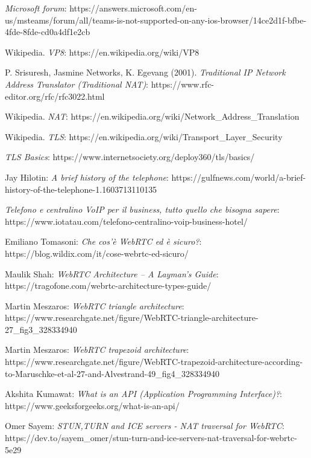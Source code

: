 \documentclass[11pt, a4paper, openany]{book}
\begin{document}
\begin{thebibliography}{9}
 		\emph{Microsoft forum}: https://answers.microsoft.com/en-us/msteams/forum/all/teams-is-not-supported-on-any-ios-browser/14ce2d1f-bfbe-4fde-8fde-cd0a4df1e2cb
 		
 		Wikipedia. \emph{VP8}: https://en.wikipedia.org/wiki/VP8
 		
 		 P. Srisuresh, Jasmine Networks, K. Egevang (2001). \emph{Traditional IP Network Address Translator (Traditional NAT)}: https://www.rfc-editor.org/rfc/rfc3022.html
 		
 		Wikipedia. \emph{NAT}: https://en.wikipedia.org/wiki/Network\_Address\_Translation
 		
 		Wikipedia. \emph{TLS}: https://en.wikipedia.org/wiki/Transport\_Layer\_Security
 		
 		\emph{TLS Basics}: https://www.internetsociety.org/deploy360/tls/basics/	
  		
  		Jay Hilotin: \emph{A brief history of the telephone}: https://gulfnews.com/world/a-brief-history-of-the-telephone-1.1603713110135
  		
  		\emph{Telefono e centralino VoIP per il business, tutto quello che bisogna sapere}: 
  		https://www.iotatau.com/telefono-centralino-voip-business-hotel/
  		
  		Emiliano Tomasoni: \emph{Che cos’è WebRTC ed è sicuro?}: 
  		https://blog.wildix.com/it/cose-webrtc-ed-sicuro/
  		
  		Maulik Shah: \emph{WebRTC Architecture – A Layman’s Guide}: 
  		https://tragofone.com/webrtc-architecture-types-guide/
  		
  		Martin Meszaros: \emph{WebRTC triangle architecture}: 
  		https://www.researchgate.net/figure/WebRTC-triangle-architecture-27\_fig3\_328334940
  		
  		Martin Meszaros: \emph{WebRTC trapezoid architecture}: 
  		https://www.researchgate.net/figure/WebRTC-trapezoid-architecture-according-to-Maruschke-et-al-27-and-Alvestrand-49\_fig4\_328334940
  		
  		Akshita Kumawat: \emph{What is an API (Application Programming Interface)?}:
  		https://www.geeksforgeeks.org/what-is-an-api/
  		
  		Omer Sayem: \emph{STUN,TURN and ICE servers - NAT traversal for WebRTC}:
  		https://dev.to/sayem\_omer/stun-turn-and-ice-servers-nat-traversal-for-webrtc-5e29
  		

\end{thebibliography}
\end{document}
